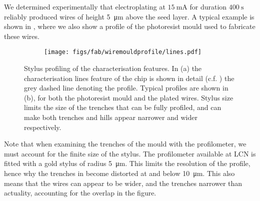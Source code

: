 We determined experimentally that electroplating at $\SI{15}{\milli\ampere}$
for duration $\SI{400}{\second}$ reliably produced wires of height
\SI{5}{\micro\meter} above the seed layer. A typical example is shown in
, where we also show a profile of the photoresist
mould used to fabricate these wires.

\begin{figure}[h]
  \centering
  \begin{subfigure}[b]{0.3\textwidth}
    \texttt{[image: figs/fab/wiremouldprofile/lines.pdf]}
    \vspace{1cm}
    \caption{}
  \end{subfigure}
  \hspace{1cm}
  \begin{subfigure}[b]{0.55\textwidth}
    \caption{}
  \end{subfigure}
  \caption{Stylus profiling of the characterisation features. In (a) the
  characterisation lines feature of the chip is shown in detail (c.f.
  ) the grey dashed line denoting the
  profile. Typical profiles are shown in (b), for both the photoresist
  mould and the plated wires. Stylus size limits the size of the trenches that
  can be fully profiled, and can make both trenches and hills appear narrower
  and wider respectively.
  }
  \label{fab:fig:chipprofile}
\end{figure}

Note that when examining the trenches of the mould with the profilometer, we
must account for the finite size of the stylus.
The profilometer available at LCN is fitted with a gold stylus of radius
\SI{5}{\micro\meter}. This limits the resolution of the profile, hence why the
trenches in  become distorted at and below
\SI{10}{\micro\meter}. This also means that the wires can appear to be 
wider, and the trenches narrower than actuality, accounting for the overlap in the
figure.

